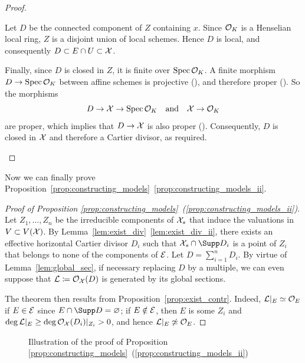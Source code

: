 \begin{proof}
\begin{enumerate}[(a)]
            Let $D$ be the connected component of $Z$ containing $x$.
            Since $\mathcal{O}_{K}$ is a Henselian local ring, $Z$ is a disjoint union of local schemes.
            Hence $D$ is local, and consequently $D \subset E \cap U \subset \mathcal X$. %

            Finally, since $D$ is closed in $Z$, it is finite over $\operatorname{Spec} \mathcal{O}_K$.
            A finite morphism $D \to \operatorname{Spec} \mathcal{O}_K$ between affine schemes is projective (\cite[Exercise 3.3.22]{Liu}),
            and therefore proper (\cite[Theorem 3.3.30]{Liu}).
            So the morphisms
            \[
                D \to \mathcal X \to \operatorname{Spec} \mathcal{O}_K \quad
                \textrm{and} \quad
                \mathcal X \to \mathcal{O}_K
            \]
            are proper, which implies that $D \to \mathcal X$ is also proper (\cite[Proposition 3.3.16(e)]{Liu}). Consequently, $D$ is closed in $\mathcal X$ and therefore a Cartier divisor, as required.
    \end{enumerate}
\end{proof}

Now we can finally prove Proposition~\ref{prop:constructing_models}~\ref{prop:constructing_models_ii}.

\begin{proof}[Proof of Proposition \ref{prop:constructing_models}~(\ref{prop:constructing_models_ii})]
    Let $Z_1, \dots, Z_n$ be the irreducible components of $\mathcal X_s$ that induce the valuations in $V \subset V(\mathcal X)$.
    By Lemma~\ref{lem:exist_div}~\ref{lem:exist_div_ii}, there exists an effective horizontal Cartier divisor $D_i$
    such that $\X_s \cap \Supp D_i$ is a point of $Z_i$ that belongs to none of the components of $\mathcal{E}$.
    Let $D = \sum_{i=1}^n D_i$.
    By virtue of Lemma~\ref{lem:global_sec}, if necessary replacing $D$ by a multiple, we can even suppose that
    $\mathcal{L} \coloneqq \mathcal{O}_\mathcal X(D)$ is generated by its global sections.

    The theorem then results from Proposition~\ref{prop:exist_contr}.
    Indeed, \(\mathcal{L}|_E \simeq \mathcal{O}_E\) if $E \in \mathcal{E}$ since $E \cap \Supp D = \varnothing$;
    if $E \notin \mathcal{E}$, then $E$ is some $Z_i$ and $\deg \mathcal{L}|_E \geq \deg \mathcal{O}_\mathcal X(D_i)|_{Z_i} > 0$, and hence \(\mathcal{L}|_E \not\simeq \mathcal{O}_E\).
\end{proof}

\begin{figure}[h!] \label{fig:illustration-of-proof-of-prop-constructing-models}
    \centering
    \caption{Illustration of the proof of Proposition \ref{prop:constructing_models}~(\ref{prop:constructing_models_ii})}
\end{figure}


